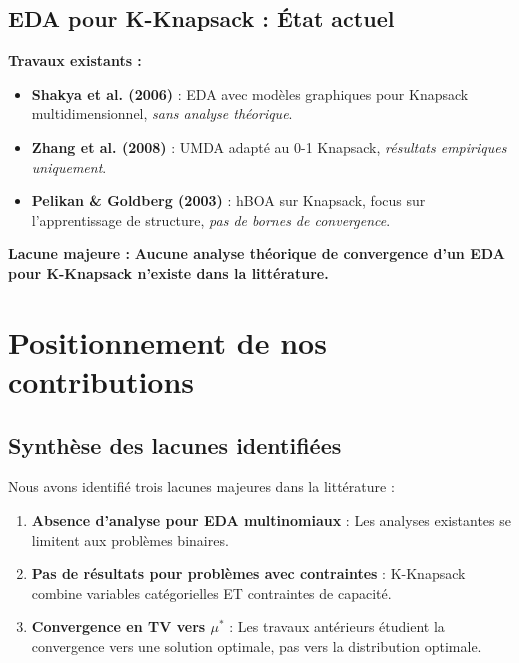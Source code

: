 \documentclass[12pt,a4paper]{article}
\theoremstyle{definition}
\theoremstyle{remark}
\begin{document}
\subsection{EDA pour K-Knapsack : État actuel}

\textbf{Travaux existants :}

\begin{itemize}
    \item \textbf{Shakya et al. (2006)} \cite{shakya2006markov} : EDA avec modèles graphiques pour Knapsack multidimensionnel, \emph{sans analyse théorique}.
    
    \item \textbf{Zhang et al. (2008)} \cite{zhang2008eda} : UMDA adapté au 0-1 Knapsack, \emph{résultats empiriques uniquement}.
    
    \item \textbf{Pelikan \& Goldberg (2003)} \cite{pelikan2003hierarchical} : hBOA sur Knapsack, focus sur l'apprentissage de structure, \emph{pas de bornes de convergence}.
\end{itemize}

\textbf{Lacune majeure :} \textbf{Aucune analyse théorique de convergence d'un EDA pour K-Knapsack n'existe dans la littérature.}

\section{Positionnement de nos contributions}

\subsection{Synthèse des lacunes identifiées}

Nous avons identifié trois lacunes majeures dans la littérature :

\begin{enumerate}
    \item \textbf{Absence d'analyse pour EDA multinomiaux} : Les analyses existantes \cite{lehre2019runtime, witt2019runtime} se limitent aux problèmes binaires.
    
    \item \textbf{Pas de résultats pour problèmes avec contraintes} : K-Knapsack combine variables catégorielles ET contraintes de capacité.
    
    \item \textbf{Convergence en TV vers $\mu^*$} : Les travaux antérieurs étudient la convergence vers une solution optimale, pas vers la distribution optimale.
\end{enumerate}
\end{document}
